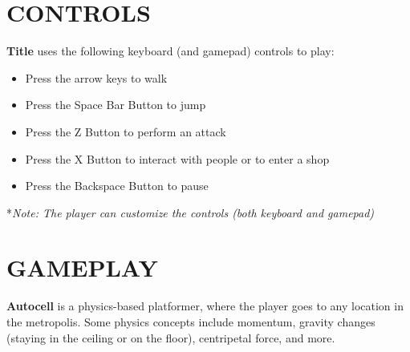\documentclass[12pt]{article}
\begin{document}
\begin{CJK}{UTF8}{min}
	\section*{CONTROLS}
	\textbf{Title} uses the following keyboard (and gamepad) controls to play:
	\begin{itemize}[noitemsep]
		\item Press the arrow keys to walk
		\item Press the Space Bar Button to jump
		\item Press the Z Button to perform an attack
		\item Press the X Button to interact with people or to enter a shop
		\item Press the Backspace Button to pause
	\end{itemize}
	*\textit{Note: The player can customize the controls (both keyboard and gamepad)}
	\newpage
	\section*{GAMEPLAY}
	\textbf{Autocell} is a physics-based platformer, where the player goes to any location in the metropolis. Some physics concepts include momentum, gravity changes (staying in the ceiling or on the floor), centripetal force, and more.

\end{CJK}
\end{document}

